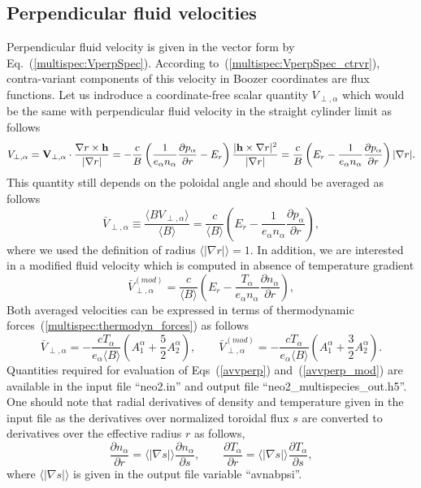 \documentclass[preprint,prb,aps]{revtex4-1}
\newcommand{\be}[1]{\begin{equation} \label{#1}}
\newcommand{\ee}{\end{equation}}
\newcommand{\eq}[1]{(\ref{#1})}
\newcommand{\difp}[2]{\frac{\partial #1}{\partial #2}}
\newcommand{\bV}{{\bf V}}
\newcommand{\bh}{{\bf h}}
\begin{document}

\subsection{Perpendicular fluid velocities}

Perpendicular fluid velocity is given in the vector form by Eq.~\eq{multispec:VperpSpec}.
According to~\eq{multispec:VperpSpec_ctrvr}, contra-variant components of this velocity in
Boozer coordinates are flux functions. Let us indroduce a coordinate-free scalar quantity
$V_{\perp,\alpha}$ which would be the same with perpendicular fluid velocity in the straight
cylinder limit as follows
\be{scalvperp}
V_{\perp,\alpha}=\bV_{\perp,\alpha}\cdot\frac{\nabla r \times\bh}{|\nabla r|}
=
-\frac{c}{B} \left( \frac{1}{e_\alpha n_\alpha} \difp{p_\alpha}{r} - E_r \right)
\frac{|\bh \times {\nabla}r|^2}{|\nabla r|}
=\frac{c}{B} \left( E_r - \frac{1}{e_\alpha n_\alpha} \difp{p_\alpha}{r}\right) |\nabla r|.
\ee
This quantity still depends on the poloidal angle and should be averaged as follows
\be{avvperp}
\bar V_{\perp,\alpha}\equiv
\frac{\langle B V_{\perp,\alpha}\rangle}{\langle B \rangle}
=
\frac{c}{\langle B \rangle}
\left( E_r - \frac{1}{e_\alpha n_\alpha} \difp{p_\alpha}{r}\right),
\ee
where we used the definition of radius $\langle |\nabla r| \rangle = 1$.
In addition, we are interested in a modified fluid velocity which is computed
in absence of temperature gradient
\be{avvperp_mod}
\bar V_{\perp,\alpha}^{(mod)}
=
\frac{c}{\langle B \rangle}
\left( E_r - \frac{T_\alpha}{e_\alpha n_\alpha} \difp{n_\alpha}{r}\right),
\ee
Both averaged velocities can be expressed in terms of thermodynamic
forces~\eq{multispec:thermodyn_forces} as follows
\be{avvperp_forces}
\bar V_{\perp,\alpha} = -\frac{c T_\alpha}{e_\alpha \langle B \rangle}
\left(A_1^\alpha+\frac{5}{2}A_2^\alpha\right),
\qquad
\bar V_{\perp,\alpha}^{(mod)} = -\frac{c T_\alpha}{e_\alpha \langle B \rangle}
\left(A_1^\alpha+\frac{3}{2}A_2^\alpha\right).
\ee
Quantities required for evaluation of Eqs~\eq{avvperp} and~\eq{avvperp_mod} are available
in the input file ``neo2.in'' and output file ``neo2\_multispecies\_out.h5''. One should
note that radial derivatives of density and temperature given in the input file as the
derivatives over normalized toroidal flux $s$ are converted to derivatives over
the effective radius $r$ as follows,
\be{radders}
\difp{n_\alpha}{r}=\langle|\nabla s|\rangle \difp{n_\alpha}{s},
\qquad
\difp{T_\alpha}{r}=\langle|\nabla s|\rangle \difp{T_\alpha}{s},
\ee
where $\langle|\nabla s|\rangle$ is given in the output file variable ``avnabpsi''.
\end{document}
